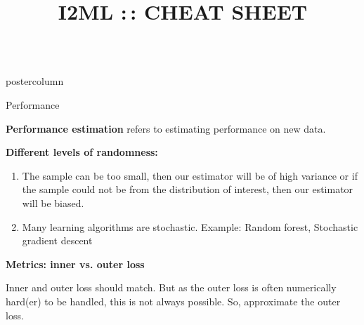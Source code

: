 \documentclass{beamer}
\title{I2ML :\,: CHEAT SHEET} %
\newlength{\columnheight} %
\begin{document}
\begin{frame}[fragile]{}
\begin{columns}
	\begin{column}{.31\textwidth}
		\begin{beamercolorbox}[center]{postercolumn}
			\begin{minipage}{.98\textwidth}
				\parbox[t][\columnheight]{\textwidth}{
					\begin{myblock}{Performance}
                        \hspace*{1ex}
						\begin{codebox}
							\textbf{Performance estimation} refers to estimating performance on new data.
						\end{codebox}
					    \hspace*{1ex}
						\begin{codebox}
							\textbf{Different levels of randomness:}
						\end{codebox}
						\begin{enumerate}
                        \item The sample can be too small, then our estimator will be of high variance or if the sample could not be from the distribution of interest, then our estimator will be biased.
                        \item Many learning algorithms are stochastic. Example: Random forest, Stochastic gradient descent
                        \end{enumerate}
						\hspace*{1ex}
	
						\begin{codebox}
							 \textbf{Metrics: inner vs. outer loss}
						\end{codebox}
						Inner and outer loss should match. But as the outer loss is often numerically hard(er) to be handled, this is not always possible. So, approximate the outer loss.
						\hspace*{1ex}
				

\end{myblock}}
\end{minipage}
\end{beamercolorbox}
\end{column}
\end{columns}
\end{frame}
\end{document}
